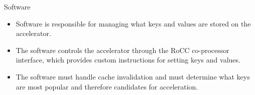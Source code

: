 \begin{block}{Software}

\begin{itemize}
    \item Software is responsible for managing what keys and values are
        stored on the accelerator.
    \item The software controls the accelerator through the RoCC co-processor
        interface, which provides custom instructions for setting keys and
        values.
    \item The software must handle cache invalidation and must determine
        what keys are most popular and therefore candidates for acceleration.
\end{itemize}


\end{block}
